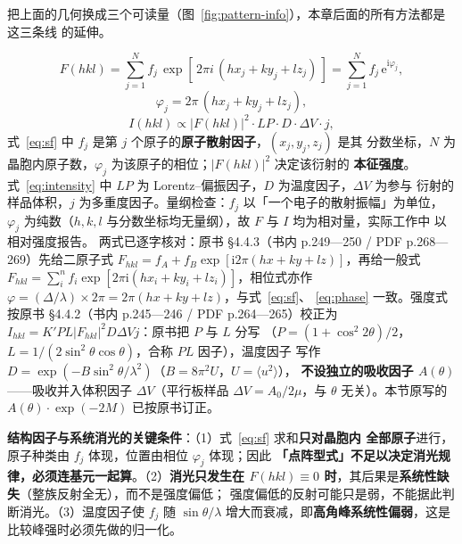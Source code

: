 把上面的几何换成三个可读量（图~\ref{fig:pattern-info}），本章后面的所有方法都是这三条线
的延伸。

\begin{equation}
F(hkl)=\sum_{j=1}^{N} f_j\,
\exp\!\left[\,2\pi i\,(hx_j+ky_j+lz_j)\,\right]
=\sum_{j=1}^{N} f_j\,\mathrm{e}^{\mathrm{i}\varphi_j},
\label{eq:sf}
\end{equation}
\begin{equation}
\varphi_j=2\pi\,(hx_j+ky_j+lz_j),
\label{eq:phase}
\end{equation}
\begin{equation}
I(hkl)\propto\left|F(hkl)\right|^{2}\cdot LP\cdot D\cdot\Delta V\cdot j,
\label{eq:intensity}
\end{equation}
式~\eqref{eq:sf} 中 $f_j$ 是第 $j$ 个原子的\textbf{原子散射因子}，$(x_j,y_j,z_j)$ 是其
分数坐标，$N$ 为晶胞内原子数，$\varphi_j$ 为该原子的相位；$|F(hkl)|^{2}$ 决定该衍射的
\textbf{本征强度}。
式~\eqref{eq:intensity} 中 $LP$ 为 Lorentz--偏振因子，$D$ 为温度因子，$\Delta V$ 为参与
衍射的样品体积，$j$ 为多重度因子。量纲检查：$f_j$ 以「一个电子的散射振幅」为单位，
$\varphi_j$ 为纯数（$h,k,l$ 与分数坐标均无量纲），故 $F$ 与 $I$ 均为相对量，实际工作中
以相对强度报告。
两式已逐字核对：原书 §4.4.3（书内 p.249—250 / PDF p.268—269）先给二原子式
$F_{hkl}=f_A+f_B\exp[\mathrm{i}2\pi(hx+ky+lz)]$，再给一般式
$F_{hkl}=\sum_{i}^{n}f_i\exp[2\pi\mathrm{i}(hx_i+ky_i+lz_i)]$，相位式亦作
$\varphi=(\Delta/\lambda)\times2\pi=2\pi(hx+ky+lz)$，与式~\eqref{eq:sf}、
\eqref{eq:phase} 一致。强度式按原书 §4.4.2（书内 p.245—246 / PDF p.264—265）校正为
$I_{hkl}=K'PL|F_{hkl}|^{2}D\Delta Vj$：原书把 $P$ 与 $L$ 分写
（$P=(1+\cos^{2}2\theta)/2$，$L=1/(2\sin^{2}\theta\cos\theta)$，合称 $PL$ 因子），温度因子
写作 $D=\exp(-B\sin^{2}\theta/\lambda^{2})$（$B=8\pi^{2}U$，$U=\langle u^{2}\rangle$），
\textbf{不设独立的吸收因子 $A(\theta)$}——吸收并入体积因子 $\Delta V$（平行板样品
$\Delta V=A_0/2\mu$，与 $\theta$ 无关）。本节原写的 $A(\theta)\cdot\exp(-2M)$ 已按原书订正。

\begin{keycond}
\textbf{结构因子与系统消光的关键条件}：（1）式~\eqref{eq:sf} 求和\textbf{只对晶胞内
全部原子}进行，原子种类由 $f_j$ 体现，位置由相位 $\varphi_j$ 体现；因此
\textbf{「点阵型式」不足以决定消光规律，必须连基元一起算}。（2）\textbf{消光只发生在
$F(hkl)\equiv0$ 时}，其后果是\textbf{系统性缺失}（整族反射全无），而不是强度偏低；
强度偏低的反射可能只是弱，不能据此判断消光。（3）温度因子使 $f_j$ 随 $\sin\theta/\lambda$
增大而衰减，即\textbf{高角峰系统性偏弱}，这是比较峰强时必须先做的归一化。
\end{keycond}

